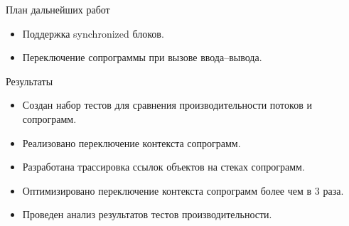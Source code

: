 \begin{frame}{План дальнейших работ} 
	\begin{itemize}
		\item Поддержка synchronized блоков.
		\item Переключение сопрограммы при вызове ввода--вывода.
	\end{itemize}
\end{frame}

\begin{frame}{Результаты}
	\begin{itemize}
		\item Создан набор тестов для сравнения производительности потоков и сопрограмм.
		\item Реализовано переключение контекста сопрограмм.
		\item Разработана трассировка ссылок объектов на стеках сопрограмм.
		\item Оптимизировано переключение контекста сопрограмм более чем в 3 раза.
		\item Проведен анализ результатов тестов производительности.
	\end{itemize}
\end{frame}

